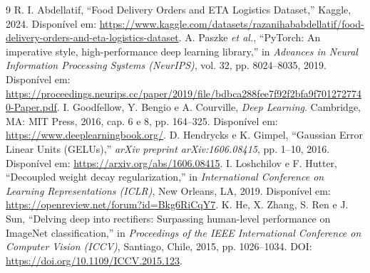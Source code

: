 \documentclass[12pt,a4paper]{article}
\begin{document}
\begin{thebibliography}{9}
 R. I. Abdellatif, ``Food Delivery Orders and ETA Logistics Dataset,'' Kaggle, 2024. Disponível em: \url{https://www.kaggle.com/datasets/razanihababdellatif/food-delivery-orders-and-eta-logistics-dataset}.
 A. Paszke \emph{et al.}, ``PyTorch: An imperative style, high-performance deep learning library,'' in \emph{Advances in Neural Information Processing Systems (NeurIPS)}, vol. 32, pp. 8024--8035, 2019. Disponível em: \url{https://proceedings.neurips.cc/paper/2019/file/bdbca288fee7f92f2bfa9f7012727740-Paper.pdf}.
 I. Goodfellow, Y. Bengio e A. Courville, \emph{Deep Learning}. Cambridge, MA: MIT Press, 2016, cap. 6 e 8, pp. 164--325. Disponível em: \url{https://www.deeplearningbook.org/}.
 D. Hendrycks e K. Gimpel, ``Gaussian Error Linear Units (GELUs),'' \emph{arXiv preprint arXiv:1606.08415}, pp. 1--10, 2016. Disponível em: \url{https://arxiv.org/abs/1606.08415}.
 I. Loshchilov e F. Hutter, ``Decoupled weight decay regularization,'' in \emph{International Conference on Learning Representations (ICLR)}, New Orleans, LA, 2019. Disponível em: \url{https://openreview.net/forum?id=Bkg6RiCqY7}.
 K. He, X. Zhang, S. Ren e J. Sun, ``Delving deep into rectifiers: Surpassing human-level performance on ImageNet classification,'' in \emph{Proceedings of the IEEE International Conference on Computer Vision (ICCV)}, Santiago, Chile, 2015, pp. 1026--1034. DOI: \url{https://doi.org/10.1109/ICCV.2015.123}.
\end{thebibliography}
\end{document}
